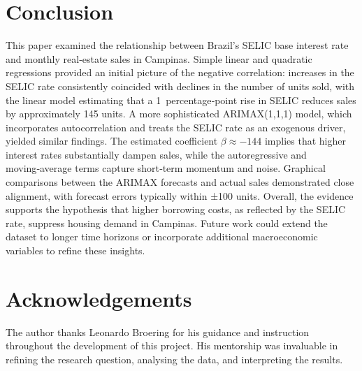 \documentclass[10pt]{article}
\begin{document}
\section{Conclusion}
\label{sec:conclusion}

This paper examined the relationship between Brazil’s SELIC base interest rate and monthly real‑estate sales in Campinas.  Simple linear and quadratic regressions provided an initial picture of the negative correlation: increases in the SELIC rate consistently coincided with declines in the number of units sold, with the linear model estimating that a 1 percentage‑point rise in SELIC reduces sales by approximately 145 units.  A more sophisticated ARIMAX(1,1,1) model, which incorporates autocorrelation and treats the SELIC rate as an exogenous driver, yielded similar findings.  The estimated coefficient $\beta\approx -144$ implies that higher interest rates substantially dampen sales, while the autoregressive and moving‑average terms capture short‑term momentum and noise.  Graphical comparisons between the ARIMAX forecasts and actual sales demonstrated close alignment, with forecast errors typically within ±100 units.  Overall, the evidence supports the hypothesis that higher borrowing costs, as reflected by the SELIC rate, suppress housing demand in Campinas.  Future work could extend the dataset to longer time horizons or incorporate additional macroeconomic variables to refine these insights.

\section*{Acknowledgements}

The author thanks Leonardo Broering for his guidance and instruction throughout the development of this project.  His mentorship was invaluable in refining the research question, analysing the data, and interpreting the results.
\end{document}
